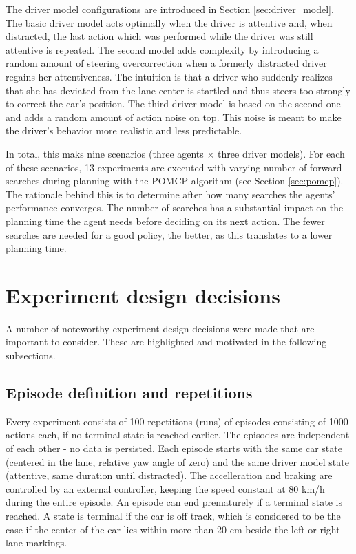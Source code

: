 The driver model configurations are introduced in Section \ref{sec:driver_model}. The basic driver model acts optimally when the driver is attentive and, when distracted, the last action which was performed while the driver was still attentive is repeated. The second model adds complexity by introducing a random amount of steering overcorrection when a formerly distracted driver regains her attentiveness. The intuition is that  a driver who suddenly realizes that she has deviated from the lane center is startled and thus steers too strongly to correct the car's position. The third driver model is based on the second one and adds a random amount of action noise on top. This noise is meant to make the driver's behavior more realistic and less predictable.

In total, this maks nine scenarios (three agents $\times$ three driver models). For each of these scenarios, 13 experiments are executed with varying number of forward searches during planning with the POMCP algorithm (see Section \ref{sec:pomcp}). The rationale behind this is to determine after how many searches the agents' performance converges. The number of searches has a substantial impact on the planning time the agent needs before deciding on its next action. The fewer searches are needed for a good policy, the better, as this translates to a lower planning time.

\section{Experiment design decisions}
\label{sec:design_decisions}
A number of noteworthy experiment design decisions were made that are important to consider. These are highlighted and motivated in the following subsections.

\subsection{Episode definition and repetitions}



Every experiment consists of 100 repetitions (runs) of episodes consisting of 1000 actions each, if no terminal state is reached earlier. The episodes are independent of each other - no data is persisted. Each episode starts with the same car state (centered in the lane, relative yaw angle of zero) and the same driver model state (attentive, same duration until distracted). The accelleration and braking are controlled by an external controller, keeping the speed constant at 80 km/h during the entire episode. An episode can end prematurely if a terminal state is reached. A state is terminal if the car is off track, which is considered to be the case if the center of the car lies within more than 20 cm beside the left or right lane markings.

